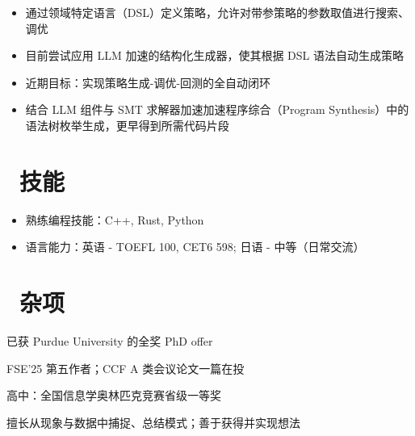\documentclass{compact_resume}
\begin{document}
\begin{itemize}[parsep=0.5ex]
  \item 通过领域特定语言（DSL）定义策略，允许对带参策略的参数取值进行搜索、调优
  \item 目前尝试应用 LLM 加速的结构化生成器，使其根据 DSL 语法自动生成策略
  \item 近期目标：实现策略生成-调优-回测的全自动闭环
\end{itemize}

\begin{itemize}[parsep=0.5ex]
  \item 结合 LLM 组件与 SMT 求解器加速加速程序综合（Program Synthesis）中的语法树枚举生成，更早得到所需代码片段
\end{itemize}

\section{\faCogs\ 技能}
\begin{itemize}[parsep=0.5ex]
  \item 熟练编程技能：C++, Rust, Python
  \item 语言能力：英语 - TOEFL 100, CET6 598; 日语 - 中等（日常交流）
\end{itemize}

\section{\faInfo\ 杂项}
\begin{description}[parsep=0.5ex]
  \item[升学] 已获 Purdue University 的全奖 PhD offer
  \item[论文] FSE'25 第五作者；CCF A 类会议论文一篇在投
  \item[竞赛] 高中：全国信息学奥林匹克竞赛省级一等奖
  \item[特长] 擅长从现象与数据中捕捉、总结模式；善于获得并实现想法
\end{description}
\end{document}
